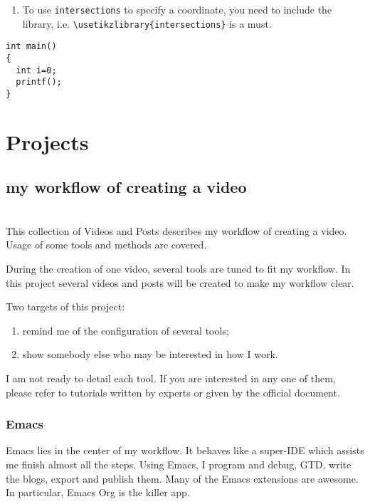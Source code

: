 \documentclass[koma,utopia,a4paper,captions=tableheading,11pt,listings-sv,microtype,paralist,colorlinks=true,urlcolor=blue]{org-article}
\begin{document}
\begin{enumerate}
\item To use \texttt{intersections} to specify a coordinate, you need to include the
library, i.e. \texttt{\textbackslash{}usetikzlibrary\{intersections\}} is a must.
\end{enumerate}


\lstset{language=C,label= ,caption= ,captionpos=b,numbers=none}
\begin{lstlisting}
int main()
{
  int i=0;
  printf();
}
\end{lstlisting}




\section{Projects}
\label{sec:org92a94e0}


\subsection{my workflow of creating a video}
\label{sec:orga6b7968}
\hspace{0pt}\\


This collection of Videos and Posts describes my workflow of creating a video. Usage of some tools and methods are covered.


During the creation of one video, several tools are tuned to fit my workflow. In
this project several videos and posts will be created to make my workflow clear.

Two targets of this project:
\begin{enumerate}
\item remind me of the configuration of several tools;
\item show somebody else who may be interested in how I work.
\end{enumerate}

I am not ready to detail each tool. If you are interested in any one of them,
please refer to tutorials written by experts or given by the official document.

\subsubsection{Emacs}
\label{sec:org9c05b58}


Emacs lies in the center of my workflow. It behaves like a super-IDE which
assists me finish almost all the steps. Using Emacs, I program and debug, GTD,
write the blogs, export and publish them. Many of the Emacs extensions are
awesome. In particular, Emacs Org is the killer app.
\end{document}
